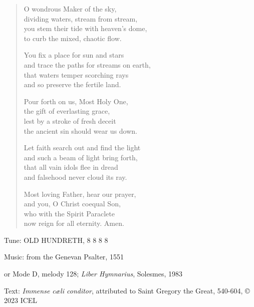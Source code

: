 \hymn

\begin{verse}
O wondrous Maker of the sky,\\
dividing waters, stream from stream,\\
you stem their tide with heaven’s dome,\\
to curb the mixed, chaotic flow.

You fix a place for sun and stars\\
and trace the paths for streams on earth,\\
that waters temper scorching rays\\
and so preserve the fertile land.

Pour forth on us, Most Holy One,\\
the gift of everlasting grace,\\
lest by a stroke of fresh deceit\\
the ancient sin should wear us down.

Let faith search out and find the light\\
and such a beam of light bring forth,\\
that all vain idols flee in dread\\
and falsehood never cloud its ray.

Most loving Father, hear our prayer,\\
and you, O Christ coequal Son,\\
who with the Spirit Paraclete\\
now reign for all eternity. Amen.
\end{verse}

\begin{hymnsource}
Tune: OLD HUNDRETH, 8 8 8 8

Music: from the Genevan Psalter, 1551

or Mode D, melody 128; \emph{Liber Hymnarius}, Solesmes, 1983

Text: \emph{Immense cæli conditor}, attributed to Saint Gregory the Great, 540-604, © 2023 ICEL
\end{hymnsource}
